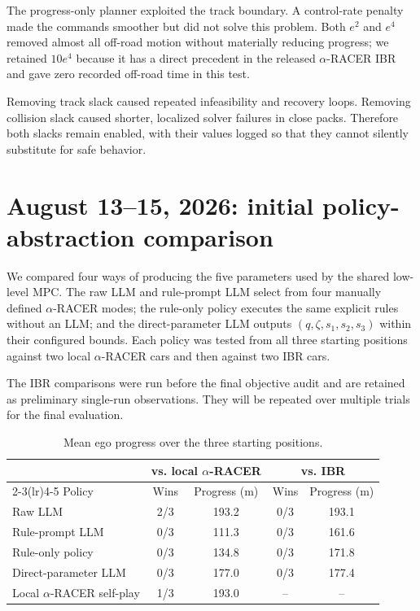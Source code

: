 \documentclass[11pt]{article}
\begin{document}
The progress-only planner exploited the track boundary. A control-rate penalty
made the commands smoother but did not solve this problem. Both $e^2$ and
$e^4$ removed almost all off-road motion without materially reducing progress;
we retained $10e^4$ because it has a direct precedent in the released
$\alpha$-RACER IBR and gave zero recorded off-road time in this test.

Removing track slack caused repeated infeasibility and recovery loops. Removing
collision slack caused shorter, localized solver failures in close packs.
Therefore both slacks remain enabled, with their values logged so that they
cannot silently substitute for safe behavior.

\section{August 13--15, 2026: initial policy-abstraction comparison}

We compared four ways of producing the five parameters used by the shared
low-level MPC. The raw LLM and rule-prompt LLM select from four manually defined
$\alpha$-RACER modes; the rule-only policy executes the same explicit rules
without an LLM; and the direct-parameter LLM outputs
$(q,\zeta,s_1,s_2,s_3)$ within their configured bounds. Each policy was tested
from all three starting positions against two local $\alpha$-RACER cars and
then against two IBR cars.

The IBR comparisons were run before the final objective audit and are retained
as preliminary single-run observations. They will be repeated over multiple
trials for the final evaluation.

\begin{table}[ht]
  \centering
  \small
  \begin{tabular}{lcccc}
    \toprule
    & \multicolumn{2}{c}{vs. local $\alpha$-RACER}
    & \multicolumn{2}{c}{vs. IBR} \\
    \cmidrule(lr){2-3}\cmidrule(lr){4-5}
    Policy & Wins & Progress (m) & Wins & Progress (m) \\
    \midrule
    Raw LLM          & 2/3 & 193.2 & 0/3 & 193.1 \\
    Rule-prompt LLM  & 0/3 & 111.3 & 0/3 & 161.6 \\
    Rule-only policy & 0/3 & 134.8 & 0/3 & 171.8 \\
    Direct-parameter LLM & 0/3 & 177.0 & 0/3 & 177.4 \\
    Local $\alpha$-RACER self-play & 1/3 & 193.0 & -- & -- \\
    \bottomrule
  \end{tabular}
  \caption{Mean ego progress over the three starting positions.}
\end{table}
\end{document}
